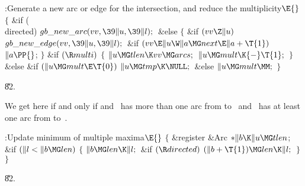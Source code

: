 \B{}:Generate a new arc or edge for the intersection, and reduce the
multiplicity\X${}\E{}$\6
${}\{{}$\1\6
\&{if} (\\{directed})\1\5
${}\\{gb\_new\_arc}(\\{vv},\39\|u,\39\|l);{}$\2\6
\&{else}\5
${}\{{}$\1\6
\&{if} ${}(\\{vv}\Z\|u){}$\1\5
${}\\{gb\_new\_edge}(\\{vv},\39\|u,\39\|l);{}$\2\6
\&{if} ${}(\\{vv}\E\|u\W\|a\MG\\{next}\E\|a+\T{1}){}$\1\5
${}\|a\PP{}$;\2\6
\4${}\}{}$\2\6
\&{if} ${}(\R\\{multi}){}$\5
${}\{{}$\1\6
${}\|u\MG\\{tlen}\K\\{vv}\MG\\{arcs};{}$\6
${}\|u\MG\\{mult}\K{-}\T{1};{}$\6
\4${}\}{}$\5
\2\&{else} \&{if} ${}(\|u\MG\\{mult}\E\T{0}){}$\1\5
${}\|u\MG\\{tmp}\K\NULL;{}$\2\6
\&{else}\1\5
${}\|u\MG\\{mult}\MM;{}$\2\6
\4${}\}{}$\2\par
\U82.\fi

We get here if and only if  and ~has
more than one arc from 
to~ and ~has at least one arc from  to~.

\Y\B\4:Update minimum of multiple maxima\X${}\E{}$\6
${}\{{}$\5
\1\&{register} \&{Arc} ${}{*}\|b\K\|u\MG\\{tlen}{}$;\7
\&{if} ${}(\|l<\|b\MG\\{len}){}$\5
${}\{{}$\1\6
${}\|b\MG\\{len}\K\|l;{}$\6
\&{if} ${}(\R\\{directed}){}$\1\5
${}(\|b+\T{1})\MG\\{len}\K\|l;{}$\2\6
\4${}\}{}$\2\6
\4${}\}{}$\2\par
\U82.\fi

